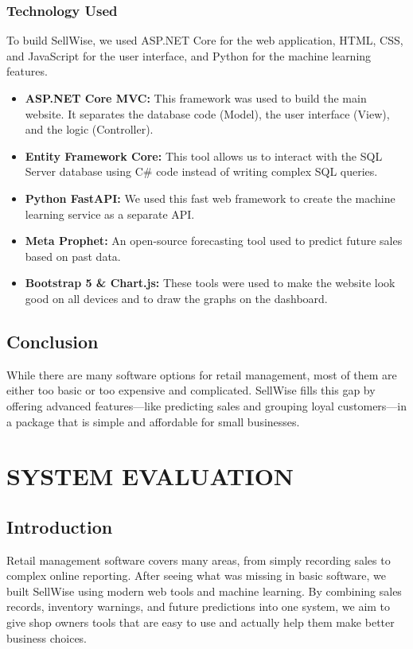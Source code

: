\documentclass[12pt,a4paper]{report}
\begin{document}
\subsection{Technology Used}
To build SellWise, we used ASP.NET Core for the web application, HTML, CSS, and JavaScript for the user interface, and Python for the machine learning features.
\begin{itemize}
    \item \textbf{ASP.NET Core MVC:} This framework was used to build the main website. It separates the database code (Model), the user interface (View), and the logic (Controller).
    \item \textbf{Entity Framework Core:} This tool allows us to interact with the SQL Server database using C\# code instead of writing complex SQL queries.
    \item \textbf{Python FastAPI:} We used this fast web framework to create the machine learning service as a separate API.
    \item \textbf{Meta Prophet:} An open-source forecasting tool used to predict future sales based on past data.
    \item \textbf{Bootstrap 5 \& Chart.js:} These tools were used to make the website look good on all devices and to draw the graphs on the dashboard.
\end{itemize}

\section{Conclusion}
While there are many software options for retail management, most of them are either too basic or too expensive and complicated. SellWise fills this gap by offering advanced features—like predicting sales and grouping loyal customers—in a package that is simple and affordable for small businesses.

\chapter{SYSTEM EVALUATION}

\section{Introduction}
Retail management software covers many areas, from simply recording sales to complex online reporting. After seeing what was missing in basic software, we built SellWise using modern web tools and machine learning. By combining sales records, inventory warnings, and future predictions into one system, we aim to give shop owners tools that are easy to use and actually help them make better business choices.
\end{document}
